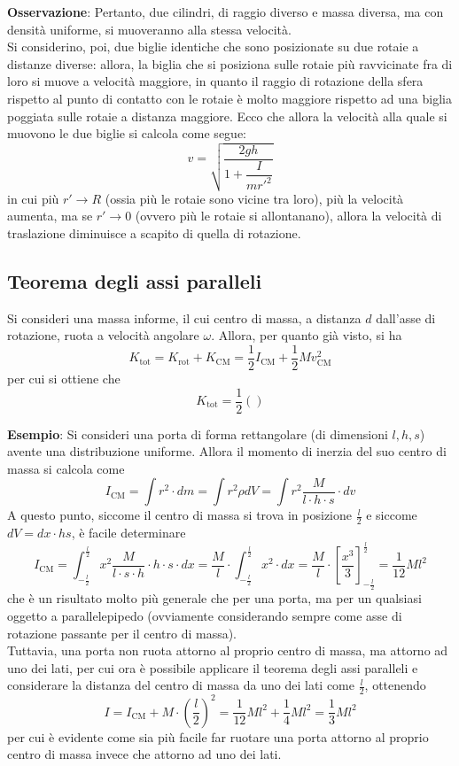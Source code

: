 \documentclass[a4paper]{extarticle}
\begin{document}
\vspace{1em}
\noindent
\textbf{Osservazione}: Pertanto, due cilindri, di raggio diverso e massa diversa, ma con densità uniforme, si muoveranno alla stessa velocità.\\
Si considerino, poi, due biglie identiche che sono posizionate su due rotaie a distanze diverse: allora, la biglia che si posiziona sulle rotaie più ravvicinate fra di loro si muove a velocità maggiore, in quanto il raggio di rotazione della sfera rispetto al punto di contatto con le rotaie è molto maggiore rispetto ad una biglia poggiata sulle rotaie a distanza maggiore. Ecco che allora la velocità alla quale si muovono le due biglie si calcola come segue:
\[\boxed{v=\sqrt{\frac{2gh}{1 + \dfrac{I}{m r'^2}}}}\]
in cui più $r' \to R$ (ossia più le rotaie sono vicine tra loro), più la velocità aumenta, ma se $r' \to 0$ (ovvero più le rotaie si allontanano), allora la velocità di traslazione diminuisce a scapito di quella di rotazione.

\vspace{1em}
\subsection{Teorema degli assi paralleli}
Si consideri una massa informe, il cui centro di massa, a distanza $d$ dall'asse di rotazione, ruota a velocità angolare $\omega$. Allora, per quanto già visto, si ha
\[K_{\text{tot}} = K_{\text{rot}} + K_{\text{CM}} = \frac{1}{2}I_{\text{CM}} + \frac{1}{2}M v_{\text{CM}}^2\]
per cui si ottiene che
\[K_{\text{tot}}=\frac{1}{2} \left(\right)\]

\vspace{1em}
\noindent
\textbf{Esempio}: Si consideri una porta di forma rettangolare (di dimensioni $l,h,s$) avente una distribuzione uniforme. Allora il momento di inerzia del suo centro di massa si calcola come
\[I_{\text{CM}}=\int r^2 \cdot dm = \int r^2 \rho dV = \int r^2 \frac{M}{l \cdot h \cdot s} \cdot dv\]
A questo punto, siccome il centro di massa si trova in posizione $\frac{l}{2}$ e siccome $dV = dx \cdot hs$, è facile determinare
\[I_{\text{CM}}=\int_{-\frac{l}{2}}^{\frac{l}{2}} x^2 \frac{M}{l \cdot s \cdot h} \cdot h \cdot s \cdot dx = \frac{M}{l} \cdot \int_{-\frac{l}{2}}^{\frac{l}{2}} x^2 \cdot dx = \frac{M}{l} \cdot \left[\frac{x^3}{3}\right]_{-\frac{l}{2}}^{\frac{l}{2}} = \frac{1}{12}Ml^2\]
che è un risultato molto più generale che per una porta, ma per un qualsiasi oggetto a parallelepipedo (ovviamente considerando sempre come asse di rotazione passante per il centro di massa).\\
Tuttavia, una porta non ruota attorno al proprio centro di massa, ma attorno ad uno dei lati, per cui ora è possibile applicare il teorema degli assi paralleli e considerare la distanza del centro di massa da uno dei lati come $\frac{l}{2}$, ottenendo
\[I=I_{\text{CM}}+M \cdot \left(\frac{l}{2}\right)^2=\frac{1}{12}Ml^2+\frac{1}{4}Ml^2=\frac{1}{3}Ml^2\]
per cui è evidente come sia più facile far ruotare una porta attorno al proprio centro di massa invece che attorno ad uno dei lati.
\end{document}
